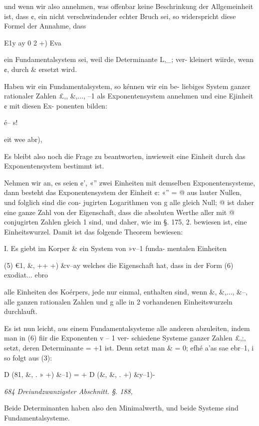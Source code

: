 \documentclass[12pt,a4paper]{article}
\theoremstyle{plain}
\theoremstyle{definition}
\begin{document}
und wenn wir also annehmen, was offenbar keine Beschrinkung der Allgemeinheit ist, dass ¢, ein nicht verschwindender echter Bruch sei, so widerspricht diese Formel der Annahme, dass

E1y ay 0 2 +) Eva

ein Fundamentalsystem sei, weil die Determinante L,\_; ver- kleinert wiirde, wenn ¢, durch \& ersetzt wird.

Haben wir ein Fundamentalsystem, so kénnen wir ein be- liebiges System ganzer rationaler Zahlen £,, \&,..., --1 als Exponentensystem annehmen und eine Ejinheit ¢ mit diesen Ex- ponenten bilden:

é-- s!

eit wee abr),

Es bleibt also noch die Frage zu beantworten, inwieweit eine Einheit durch das Exponentensystem bestimmt ist.

Nehmen wir an, es seien ¢', «'' zwei Einheiten mit demselben Exponentensysteme, dann besteht das Exponentensystem der Einheit ¢: «'' = @ aus lauter Nullen, und folglich sind die con- jugirten Logarithmen von g alle gleich Null; @ ist daher eine ganze Zahl von der Eigenschaft, dass die absoluten Werthe aller mit @ conjugirten Zahlen gleich 1 sind, und daher, wie im §. 175, 2. bewiesen ist, eine Einheitswurzel. Damit ist das folgende Theorem bewiesen:

I. Es giebt im Korper \& ein System von »v--1 funda- mentalen Einheiten

(5) €1, \&, ++ +) \&v--ay welches die Eigenschaft hat, dass in der Form (6) exodiat... ebro

alle Einheiten des Koérpers, jede nur einmal, enthalten sind, wenn \&, \&,..., \&--, alle ganzen rationalen Zahlen und g alle in 2 vorhandenen Einheitswurzeln durchlauft.

Es ist nun leicht, aus einem Fundamentalsysteme alle anderen abzuleiten, indem man in (6) fiir die Exponenten v -- 1 ver- schiedene Systeme ganzer Zahlen £,;, setzt, deren Determinante = +1 ist. Denn setzt man \& = 0; efhé a'as sae ebr--1, i so folgt aus (3):

D (81, \&, . » +) \&--1) = + D (\&, \&, . +) \&y--1)-

\vspace{0.5\baselineskip}\noindent\textit{684 Dreiundzwanzigster Abschnitt. §. 188,}\par

Beide Determinanten haben also den Minimalwerth, und beide Systeme sind Fundamentalsysteme.
\end{document}
